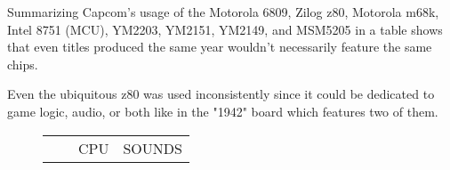 Summarizing Capcom's usage of the Motorola 6809, Zilog z80, Motorola m68k, Intel 8751 (MCU), YM2203, YM2151, YM2149, and MSM5205 in a table shows that even titles produced the same year wouldn't necessarily feature the same chips. 

Even the ubiquitous z80 was used inconsistently since it could be dedicated to game logic, audio, or both like in the "1942" board which features two of them.



\begin{figure}[H]
{ 
\setlength{\tabcolsep}{3.0pt}
\setlength\cmidrulewidth{\heavyrulewidth} %
\begin{tabularx}{\textwidth}{Xccccccccc}

  & & \multicolumn{4}{c}{CPU} &  \multicolumn{4}{c}{SOUNDS} \\
  \cmidrule(lr){3-6}
  \cmidrule(lr){7-10}
 

\end{tabularx}}
\end{figure}
